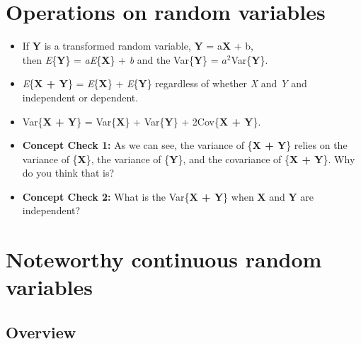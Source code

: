 \documentclass[12pt]{report}
\begin{document}
\bigskip

\bigskip

\bigskip
\section{Operations on random variables}

\begin{itemize}

\item If \textbf{Y} is a transformed random variable, \textbf{Y} = a\textbf{X} + b, \\ 
then \textit{E}\{\textbf{Y}\} = \textit{aE}\{\textbf{X}\} + \textit{b} and the Var\{\textbf{Y}\} = $a^{2}$Var\{\textbf{Y}\}.

\item  \textit{E}\{\textbf{X + Y}\} = \textit{E}\{\textbf{X}\} + \textit{E}\{\textbf{Y}\} regardless of whether \textit{X} and \textit{Y} and independent or dependent. \\

\item Var\{\textbf{X + Y}\} = Var\{\textbf{X}\} + Var\{\textbf{Y}\} + 2Cov\{\textbf{X + Y}\}. \\

\item \textbf{Concept Check 1:} As we can see, the variance of \{\textbf{X + Y}\} relies on the variance of \{\textbf{X}\}, the variance of \{\textbf{Y}\}, and the covariance of \{\textbf{X + Y}\}. Why do you think that is? 


\bigskip

\bigskip

\bigskip
\item \textbf{Concept Check 2:}  What is the Var\{\textbf{X + Y}\} when \textbf{X} and \textbf{Y} are independent? 

\end{itemize}

\bigskip

\bigskip

\bigskip
\section{Noteworthy continuous random variables}

\subsection{Overview}
\end{document}
